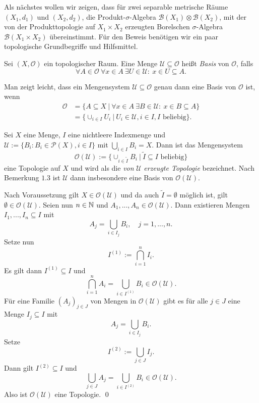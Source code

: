 Als nächstes wollen wir zeigen, dass für zwei separable metrische Räume $(X_1, d_1)$ und $(X_2,d_2)$, die Produkt-$\sigma$-Algebra
$\mathcal{B}(X_1) \otimes \mathcal{B}(X_2)$, mit der von der Produkttopologie auf $X_1 \times X_2$ erzeugten Borelschen $\sigma$-Algebra $\mathcal{B}(X_1 \times X_2)$ übereinstimmt. 
Für den Beweis benötigen wir ein paar topologische Grundbegriffe und Hilfsmittel.
\begin{mydef}
    Sei $(X, \mathcal{O})$ ein topologischer Raum. Eine Menge $\mathcal{U} \subseteq \mathcal{O}$ heißt \textit{Basis} von $\mathcal{O}$, falls
    $$
        \forall A \in \mathcal{O} \ \forall x \in A \ \exists U \in \mathcal{U}: \ x \in U \subseteq A. 
    $$
\end{mydef}

\begin{remark}
    Man zeigt leicht, dass ein Mengensystem $\mathcal{U} \subseteq \mathcal{O}$ genau dann eine Basis von $\mathcal{O}$ ist, wenn
    \begin{align*}
        \mathcal{O} &= \{A \subseteq X \ | \ \forall x \in A \ \exists B \in \mathcal{U}: \ x \in B \subseteq A\} \\\
                    &= \{\cup_{i \in I}U_i \ | \ U_i \in \mathcal{U}, i \in I, I \text{ beliebig} \}. 
    \end{align*}
\end{remark}

\begin{lemma}
    Sei $X$ eine Menge, $I$ eine nichtleere Indexmenge und $\mathcal{U} := \{B_i: B_i \in \mathcal{P}(X), i \in I\}$ mit $\bigcup_{i \in I} B_i = X$. Dann ist das Mengensystem 
    $$
        \mathcal{O}(\mathcal{U}) := \{\cup_{i \in \tilde{I}}B_i \ | \  \tilde{I} \subseteq I \text{ beliebig} \}
    $$
    eine Topologie auf $X$ und wird als die \textit{von} $\mathcal{U}$ \textit{erzeugte Topologie} bezeichnet. Nach Bemerkung $1.3$ ist $\mathcal{U}$ dann insbesondere eine Basis von $\mathcal{O}(\mathcal{U})$. 
\end{lemma}

\begin{proof*}
    Nach Voraussetzung gilt $X \in \mathcal{O}(\mathcal{U})$ und da auch $\tilde{I} = \emptyset$ möglich ist, gilt $\emptyset \in \mathcal{O}(\mathcal{U})$. 
    Seien nun $n \in \mathbb{N}$ und $A_1,...,A_n \in \mathcal{O}(\mathcal{U})$. Dann existieren Mengen $I_1,...,I_n \subseteq I$ mit 
    $$
        A_j = \bigcup_{i \in I_j}B_i, \quad j=1,...,n.
    $$ 
    Setze nun
    $$
        I^{(1)} := \bigcap_{i=1}^n I_i. 
    $$
    Es gilt dann $I^{(1)} \subseteq I$ und 
    $$
        \bigcap_{i=1}^n A_i = \bigcup_{i \in I^{(1)}}B_i \in \mathcal{O}(\mathcal{U}). 
    $$
    Für eine Familie $(A_j)_{j \in J}$ von Mengen in $\mathcal{O}(\mathcal{U})$ gibt es für alle $j \in J$ eine Menge $I_j \subseteq I$ mit 
    $$
        A_j = \bigcup_{i \in I_j} B_i. 
    $$
    Setze
    $$
        I^{(2)} := \bigcup_{j \in J}I_j. 
    $$
    Dann gilt $I^{(2)} \subseteq I$ und 
    $$
       \bigcup_{j \in J}A_j =  \bigcup_{i\in I^{(2)}}B_i \in \mathcal{O}(\mathcal{U}).
    $$
    Also ist $\mathcal{O}(\mathcal{U})$ eine Topologie. \qed 
\end{proof*}

